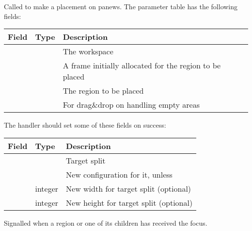 \begin{function}
    \begin{funcdesc}
      Called to make a placement on panews. The parameter table has
      the following fields:
      
      \begin{tabularx}{\linewidth}{llX}
          \hline
          Field & Type & Description \\
          \hline
          \var{ws} & \type{WPaneWS} & The workspace \\
          \var{frame} & \type{WFrame} & A frame initially allocated for the
              region to be placed \\
          \var{reg} & \type{WRegion} & The region to be placed \\
          \var{specifier} & \type{WRegion} & For drag\&drop on handling empty areas\\
      \end{tabularx}
      
      The handler should set some of these fields on success:

      \begin{tabularx}{\linewidth}{llX}
          \hline
          Field & Type & Description \\
          \hline
          \var{res_node} & \type{WSplit} & Target split \\
          \var{res_config} & \type{WFrame} &  New configuration for it, unless
              \type{WSplitRegion} \\
          \var{res_w} & integer & New width for target split (optional) \\
          \var{res_h} & integer & New height for target split (optional) \\
      \end{tabularx}
    \end{funcdesc}
\end{function}


\begin{function}
    \begin{funcdesc}
      Signalled when a region or one of its children has received the focus.
    \end{funcdesc}
\end{function}



